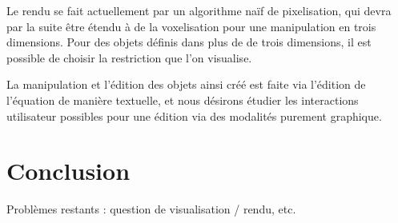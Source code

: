 \documentclass[french,12pt]{article}
\begin{document}
Le rendu se fait actuellement par un algorithme naïf de pixelisation, qui devra par la suite être étendu à de la voxelisation pour une manipulation en trois dimensions. Pour des objets définis dans plus de de trois dimensions, il est possible de choisir la restriction que l'on visualise. 

La manipulation et l'édition des objets ainsi créé est faite via l'édition de l'équation de manière textuelle, et nous désirons étudier les interactions utilisateur possibles pour une édition via des modalités purement graphique. 


\section{Conclusion}

Problèmes restants : question de visualisation / rendu, etc.

\printbibliography
\end{document}

